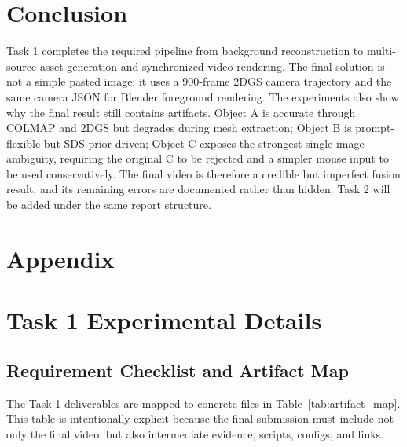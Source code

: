 \documentclass[10pt,twocolumn,letterpaper]{article}
\begin{document}
\section{Conclusion}
Task 1 completes the required pipeline from background reconstruction to multi-source asset generation and synchronized video rendering.
The final solution is not a simple pasted image: it uses a 900-frame 2DGS camera trajectory and the same camera JSON for Blender foreground rendering.
The experiments also show why the final result still contains artifacts.
Object A is accurate through COLMAP and 2DGS but degrades during mesh extraction; Object B is prompt-flexible but SDS-prior driven; Object C exposes the strongest single-image ambiguity, requiring the original C to be rejected and a simpler mouse input to be used conservatively.
The final video is therefore a credible but imperfect fusion result, and its remaining errors are documented rather than hidden.
Task 2 will be added under the same report structure.

\appendix

\section*{Appendix}

\section{Task 1 Experimental Details}

\subsection{Requirement Checklist and Artifact Map}
The Task 1 deliverables are mapped to concrete files in Table~\ref{tab:artifact_map}.
This table is intentionally explicit because the final submission must include not only the final video, but also intermediate evidence, scripts, configs, and links.
\end{document}
